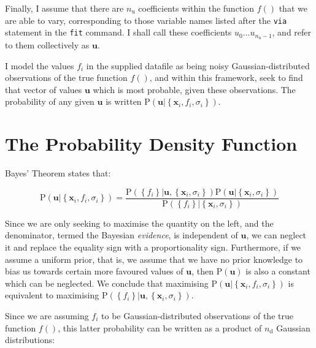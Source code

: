 Finally, I assume that there are $n_\mathrm{u}$ coefficients within the
function $f()$ that we are able to vary, corresponding to those variable names
listed after the {\tt via} statement in the {\tt fit} command. I shall
call these coefficients $u_0$...$u_{n_\mathrm{u}-1}$, and refer to them
collectively as $\mathbf{u}$.

I model the values $f_i$ in the supplied datafile as being noisy
Gaussian-distributed observations of the true function $f()$, and within this
framework, seek to find that vector of values $\mathbf{u}$ which is most
probable, given these observations. The probability of any given $\mathbf{u}$
is written
$\mathrm{P}\left( \mathbf{u} | \left\{ \mathbf{x}_i, f_i, \sigma_i \right\} \right)$.

\section{The Probability Density Function}
\label{sec:bayes_pdf}

Bayes' Theorem states that:

\begin{equation}
\mathrm{P}\left( \mathbf{u} | \left\{ \mathbf{x}_i, f_i, \sigma_i \right\} \right) =
\frac{
\mathrm{P}\left( \left\{f_i \right\} | \mathbf{u}, \left\{ \mathbf{x}_i, \sigma_i \right\} \right)
\mathrm{P}\left( \mathbf{u} | \left\{ \mathbf{x}_i, \sigma_i \right\} \right)
}{
\mathrm{P}\left( \left\{f_i \right\} | \left\{ \mathbf{x}_i, \sigma_i \right\} \right)
}
\end{equation}

Since we are only seeking to maximise the quantity on the left, and the
denominator, termed the Bayesian \textit{evidence}, is independent of
$\mathbf{u}$, we can neglect it and replace the equality sign with a
proportionality sign.  Furthermore, if we assume a uniform prior, that is, we
assume that we have no prior knowledge to bias us towards certain more favoured
values of $\mathbf{u}$, then $\mathrm{P}\left( \mathbf{u} \right)$ is also a
constant which can be neglected. We conclude that maximising $\mathrm{P}\left(
\mathbf{u} | \left\{ \mathbf{x}_i, f_i, \sigma_i \right\} \right)$ is
equivalent to maximising $\mathrm{P}\left( \left\{f_i \right\} | \mathbf{u},
\left\{ \mathbf{x}_i, \sigma_i \right\} \right)$.

Since we are assuming $f_i$ to be Gaussian-distributed observations of the true
function $f()$, this latter probability can be written as a product of
$n_\mathrm{d}$ Gaussian distributions:

